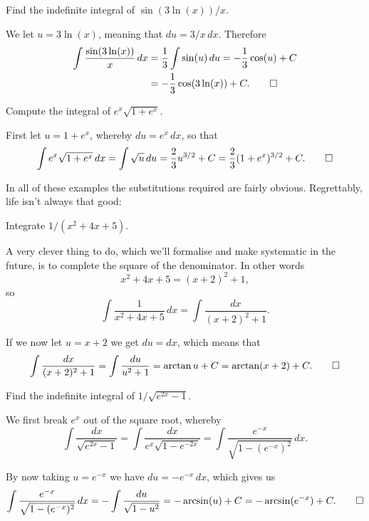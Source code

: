 \begin{example}
	Find the indefinite integral of $\sin(3 \ln(x)) / x$.

	We let $u = 3 \ln(x)$, meaning that $d u = 3 / x \, d x$.
	Therefore
	\begin{align*}
		\int \frac{\sin(3 \ln(x))}{x} \, d x & = \frac{1}{3} \int \sin(u) \, d u = - \frac{1}{3} \cos(u) + C \\
		                                     & = - \frac{1}{3} \cos(3 \ln(x)) + C. \qedhere
	\end{align*}
\end{example}

\begin{example}
	Compute the integral of $e^x \sqrt{1 + e^x}$.

	First let $u = 1 + e^x$, whereby $d u = e^x \, d x$, so that
	\[
		\int e^x \sqrt{1 + e^x} \, d x = \int \sqrt{u} \, d u = \frac{2}{3} u^{3 / 2} + C = \frac{2}{3} ( 1 + e^x )^{3 / 2} + C. \qedhere
	\]
\end{example}

\noindent
In all of these examples the substitutions required are fairly obvious.
Regrettably, life isn't always that good:

\begin{example}
	Integrate $1 / (x^2 + 4 x + 5)$.

	A very clever thing to do, which we'll formalise and make systematic in the future, is to complete the square of the denominator.
	In other words
	\[
		x^2 + 4 x + 5 = (x + 2)^2 + 1,
	\]
	so
	\[
		\int \frac{1}{x^2 + 4 x + 5} \, d x = \int \frac{d x}{(x + 2)^2 + 1}.
	\]

	\noindent
	If we now let $u = x + 2$ we get $d u = d x$, which means that
	\[
		\int \frac{d x}{(x + 2)^2 + 1} = \int \frac{d u}{u^2 + 1} = \arctan{u} + C = \arctan(x + 2) + C. \qedhere
	\]
\end{example}

\begin{example}
	Find the indefinite integral of $1 / \sqrt{e^{2 x} - 1}$.

	We first break $e^x$ out of the square root, whereby
	\[
		\int \frac{d x}{\sqrt{e^{2 x} - 1}} = \int \frac{d x}{e^x \sqrt{1 - e^{- 2x}}} = \int \frac{e^{-x}}{\sqrt{1 - (e^{- x})^2}} \, d x.
	\]

	\noindent
	By now taking $u = e^{-x}$ we have $d u = - e^{-x} \, d x$, which gives us
	\[
		\int \frac{e^{-x}}{\sqrt{1 - (e^{- x})^2}} \, d x = - \int \frac{d u}{\sqrt{1 - u^2}} = - \arcsin(u) + C = - \arcsin(e^{-x}) + C. \qedhere
	\]
\end{example}

